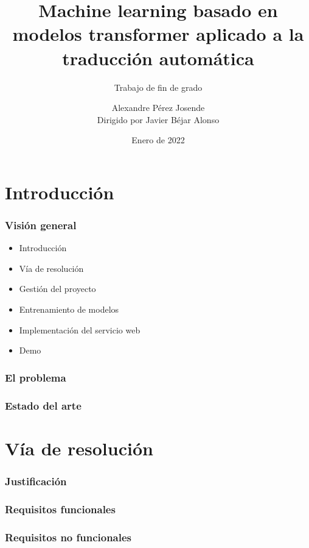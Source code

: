\documentclass{beamer}
\title{Machine learning basado en modelos transformer aplicado a la traducción automática}
\subtitle{Trabajo de fin de grado}
\author{
    \large
    Alexandre Pérez Josende\\
    \footnotesize
    Dirigido por Javier Béjar Alonso
}
\institute[UPC]{
    \footnotesize
    Universidad Politécnica de Cataluña\\
    \scriptsize
    Facultad de informática de Barcelona
    }
\date{Enero de 2022}
\begin{document}
{
    \begin{frame}
        \titlepage
    \end{frame}
}


\section{Introducción}
\begin{frame}
\frametitle{Visión general}
\begin{itemize}
    \item Introducción
    \item Vía de resolución
    \item Gestión del proyecto
    \item Entrenamiento de modelos
    \item Implementación del servicio web
    \item Demo
\end{itemize}
\end{frame}

\begin{frame}
\frametitle{El problema}
\end{frame}

\begin{frame}
\frametitle{Estado del arte}
\end{frame}







\section{Vía de resolución}
\begin{frame}
    \frametitle{Justificación}
\end{frame}

\begin{frame}
\frametitle{Requisitos funcionales}
\end{frame}

\begin{frame}
\frametitle{Requisitos no funcionales}
\end{frame}
\end{document}
